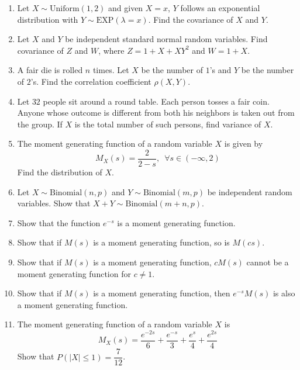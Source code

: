 \documentclass{article}
\newcommand{\abs}[1]{\displaystyle\left\lvert#1\right\rvert}
\newcommand{\bkt}[1]{\left(#1\right)}
\begin{document}
\begin{enumerate}
\begin{itemize}
	\end{itemize}
	\item
	Let $X \sim \text{Uniform}(1,2)$ and given $X=x$, $Y$ follows an exponential distribution with $Y \sim \text{EXP}\bkt{\lambda=x}$. Find the covariance of $X$ and $Y$.
	\item
	Let $X$ and $Y$ be independent standard normal random variables. Find covariance of $Z$ and $W$, where $Z = 1+X+XY^2$ and $W = 1+X$.
	\item
	A fair die is rolled $n$ times. Let $X$ be the number of $1$'s and $Y$ be the number of $2$'s. Find the correlation coefficient $\rho(X,Y)$.
	\item
	Let $32$ people sit around a round table. Each person tosses a fair coin. Anyone whose outcome is different from both his neighbors is taken out from the group. If $X$ is the total number of such persons, find variance of $X$.
	\item
	The moment generating function of a random variable $X$ is given by
	$$M_X(s) = \dfrac2{2-s}, \,\,\, \forall s \in (-\infty,2)$$
	Find the distribution of $X$.
	\item
	Let $X \sim \text{Binomial}(n,p)$ and $Y \sim \text{Binomial}(m,p)$ be independent random variables. Show that $X+Y \sim \text{Binomial}(m+n,p)$.
	\item
	Show that the function $e^{-s}$ is a moment generating function.
	\item
	Show that if $M(s)$ is a moment generating function, so is $M(cs)$.
	\item
	Show that if $M(s)$ is a moment generating function, $cM(s)$ cannot be a moment generating function for $c \neq 1$.
	\item
	Show that if $M(s)$ is a moment generating function, then $e^{-s}M(s)$ is also a moment generating function.
	\item
	The moment generating function of a random variable $X$ is
	$$M_X(s) = \dfrac{e^{-2s}}6 + \dfrac{e^{-s}}3 + \dfrac{e^{s}}4 + \dfrac{e^{2s}}4$$
	Show that $P\bkt{\abs{X} \leq 1} = \dfrac7{12}$.
	\end{enumerate}
\end{document}

